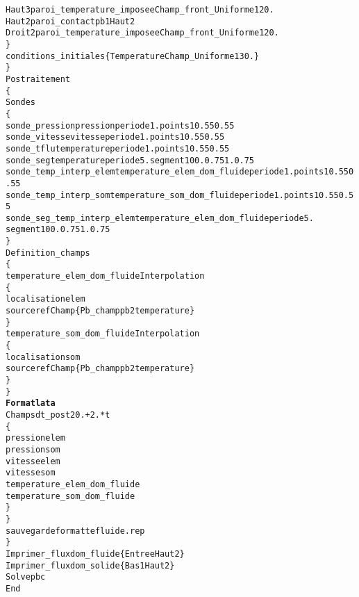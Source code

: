 \begin{alltt}
            Haut3  paroi_temperature_imposee    Champ_front_Uniforme 1 20.
            Haut2  paroi_contact pb1  Haut2
            Droit2 paroi_temperature_imposee    Champ_front_Uniforme 1 20.
        \}
        conditions_initiales \{ Temperature Champ_Uniforme 1 30. \}
    \}
    Postraitement
    \{
        Sondes
        \{
            sonde_pression  pression periode 1.     points 1    0.55 0.55
            sonde_vitesse   vitesse periode 1.      points 1    0.55 0.55
            sonde_tflu      temperature periode 1.  points 1    0.55 0.55
            sonde_seg       temperature periode 5.  segment 10 0. 0.75 1. 0.75
            sonde_temp_interp_elem temperature_elem_dom_fluide periode 1. points 1   0.55 0.55
            sonde_temp_interp_som  temperature_som_dom_fluide  periode 1. points 1   0.55 0.55
            sonde_seg_temp_interp_elem temperature_elem_dom_fluide periode 5. 
                                                                    segment 10 0. 0.75 1. 0.75
        \}
        Definition_champs 
        \{
            temperature_elem_dom_fluide Interpolation
            \{
                localisation elem
                source refChamp \{ Pb_champ pb2 temperature \}
            \}
            temperature_som_dom_fluide Interpolation 
            \{
                localisation som
                source refChamp \{ Pb_champ pb2 temperature \}
            \}
        \}
        {\bf{Format lata}}
        Champs dt_post 20.+2.*t
        \{
            pression elem
            pression som
            vitesse elem
            vitesse som
            temperature_elem_dom_fluide
            temperature_som_dom_fluide
        \}
    \}
    sauvegarde formatte fluide.rep
\}
Imprimer_flux dom_fluide \{ Entree Haut2 \}
Imprimer_flux dom_solide \{ Bas1 Haut2 \}
Solve pbc
End
\end{alltt}

